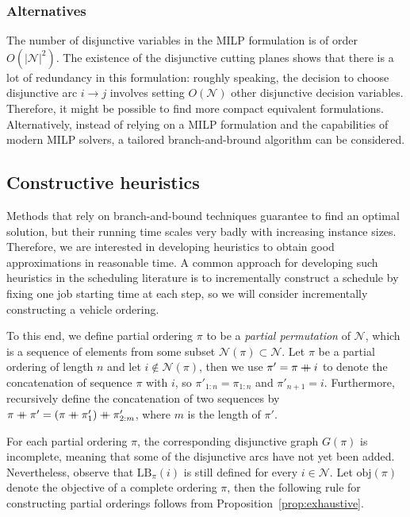 \documentclass[a4paper]{article}
\newcommand\mdoubleplus{\mathbin{+\mkern-10mu+}}
\theoremstyle{definition}
\theoremstyle{plain}
\begin{document}
\subsubsection*{Alternatives}
The number of disjunctive variables in the MILP formulation is of order $O(|\mathcal{N}|^{2})$.
%
The existence of the disjunctive cutting planes shows that there is a lot of redundancy in this formulation: roughly speaking, the decision to choose disjunctive arc $i \rightarrow j$ involves setting $O(\mathcal{N})$ other disjunctive decision variables.
%
Therefore, it might be possible to find more compact equivalent formulations.
%
Alternatively, instead of relying on a MILP formulation and the capabilities of
modern MILP solvers, a tailored branch-and-bround algorithm can be considered.



\subsection*{Constructive heuristics}

Methods that rely on branch-and-bound techniques guarantee to find an optimal
solution, but their running time scales very badly with increasing instance
sizes. Therefore, we are interested in developing heuristics to obtain good
approximations in reasonable time. A common approach for developing such
heuristics in the scheduling literature is to incrementally construct a schedule
by fixing one job starting time at each step, so we will consider incrementally
constructing a vehicle ordering.

To this end, we define partial ordering $\pi$ to be a \textit{partial permutation} of
$\mathcal{N}$, which is a sequence of elements from some subset
$\mathcal{N}(\pi) \subset \mathcal{N}$.
%
Let $\pi$ be a partial ordering of length $n$ and let
$i \notin \mathcal{N}(\pi)$, then we use $\pi' = \pi \mdoubleplus i$ to denote
the concatenation of sequence $\pi$ with $i$, so $\pi'_{1:n} = \pi_{1:n}$ and
$\pi'_{n+1} = i$. Furthermore, recursively define the concatenation of two
sequences by
$\pi \mdoubleplus \pi' = ( \pi \mdoubleplus \pi'_{1} ) \mdoubleplus \pi'_{2:m}$,
where $m$ is the length of $\pi'$.

For each partial ordering $\pi$, the corresponding disjunctive graph $G(\pi)$ is
incomplete, meaning that some of the disjunctive arcs have not yet been added.
Nevertheless, observe that $\text{LB}_{\pi}(i)$ is still defined for every
$i \in \mathcal{N}$.
%
Let $\text{obj}(\pi)$ denote the objective of a complete ordering $\pi$, then
the following rule for constructing partial orderings follows from
Proposition~\ref{prop:exhaustive}.
\end{document}
